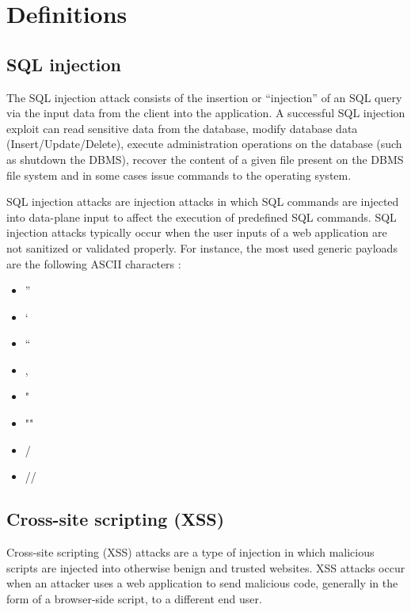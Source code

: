 
\section{Definitions}\label{owasp}\cite{owasp}


\subsection{SQL injection}
     The SQL injection attack consists of the insertion or “injection” of an SQL query via the input data from the client into the application. A successful SQL injection exploit can read sensitive data from the database, modify database data (Insert/Update/Delete), execute administration operations on the database (such as shutdown the DBMS), recover the content of a given file present on the DBMS file system and in some cases issue commands to the operating system.
     
    SQL injection attacks are injection attacks in which SQL commands are injected into data-plane input to affect the execution of predefined SQL commands. 
    SQL injection attacks typically occur when the user inputs of a web application are not sanitized or validated properly. For instance, the most used generic payloads are the following ASCII characters :
    \begin{itemize}
        \item ''
        \item `
        \item ``
        \item ,
        \item "
        \item ""
        \item /
        \item //
    \end{itemize}
    
\subsection{Cross-site scripting (XSS)}
    Cross-site scripting (XSS) attacks are a type of injection in which malicious scripts are injected into otherwise benign and trusted websites. XSS attacks occur when an attacker uses a web application to send malicious code, generally in the form of a browser-side script, to a different end user.  
    
